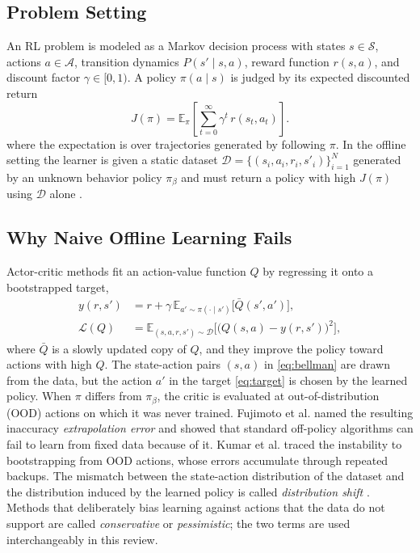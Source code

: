 \documentclass[conference]{IEEEtran}
\begin{document}
\subsection{Problem Setting}
An RL problem is modeled as a Markov decision process with states $s \in \mathcal{S}$, actions $a \in \mathcal{A}$, transition dynamics $P(s' \mid s,a)$, reward function $r(s,a)$, and discount factor $\gamma \in [0,1)$. A policy $\pi(a \mid s)$ is judged by its expected discounted return
\begin{equation}
J(\pi) = \mathbb{E}_{\pi}\!\left[\sum_{t=0}^{\infty} \gamma^{t}\, r(s_t,a_t)\right].
\label{eq:return}
\end{equation}
where the expectation is over trajectories generated by following $\pi$. In the offline setting the learner is given a static dataset $\mathcal{D} = \{(s_i,a_i,r_i,s'_i)\}_{i=1}^{N}$ generated by an unknown behavior policy $\pi_\beta$ and must return a policy with high $J(\pi)$ using $\mathcal{D}$ alone \cite{levine2020tutorial}.

\subsection{Why Naive Offline Learning Fails}
Actor-critic methods fit an action-value function $Q$ by regressing it onto a bootstrapped target,
\begin{align}
y(r,s') &= r + \gamma\, \mathbb{E}_{a' \sim \pi(\cdot \mid s')}\big[\bar{Q}(s',a')\big], \label{eq:target}\\
\mathcal{L}(Q) &= \mathbb{E}_{(s,a,r,s') \sim \mathcal{D}}\Big[\big(Q(s,a) - y(r,s')\big)^{2}\Big], \label{eq:bellman}
\end{align}
where $\bar{Q}$ is a slowly updated copy of $Q$, and they improve the policy toward actions with high $Q$. The state-action pairs $(s,a)$ in \eqref{eq:bellman} are drawn from the data, but the action $a'$ in the target \eqref{eq:target} is chosen by the learned policy. When $\pi$ differs from $\pi_\beta$, the critic is evaluated at out-of-distribution (OOD) actions on which it was never trained. Fujimoto et al. \cite{fujimoto2019bcq} named the resulting inaccuracy \emph{extrapolation error} and showed that standard off-policy algorithms can fail to learn from fixed data because of it. Kumar et al. \cite{kumar2019bear} traced the instability to bootstrapping from OOD actions, whose errors accumulate through repeated backups. The mismatch between the state-action distribution of the dataset and the distribution induced by the learned policy is called \emph{distribution shift} \cite{levine2020tutorial}. Methods that deliberately bias learning against actions that the data do not support are called \emph{conservative} or \emph{pessimistic}; the two terms are used interchangeably in this review.
\end{document}
